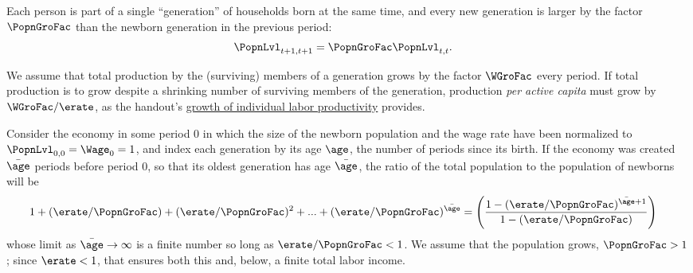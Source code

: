 \documentclass{econark}
\begin{document}
Each person is part of a single ``generation'' of households born at the
same time, and every new generation is larger by the factor $\PopnGroFac$
than the newborn generation in the previous period:
\begin{equation}\begin{gathered}\begin{aligned}
  \PopnLvl_{t+1,t+1} & =  \PopnGroFac \PopnLvl_{t,t}
.
\end{aligned}\end{gathered}\end{equation}

We assume that total production by the (surviving) members of a generation grows by
the factor $\WGroFac$ every period.  If total production is to grow
despite a shrinking number of surviving members of the generation, 
production {\it per active capita} must grow by $\WGroFac/\erate$, as the handout's \hyperref[eq:meanPreserve]{growth of individual labor productivity} provides.

Consider the economy in some period 0 in which the size of the newborn population
and the wage rate have been normalized to $\PopnLvl_{0,0} = \Wage_{0} = 1$, and index each generation by its age $\age$, the number of periods since its birth. If the economy was created $\bar{\age}$ periods before period 0, so that its oldest generation has age $\bar{\age}$, the ratio of the total population to the population
of newborns will be 
\begin{equation}\begin{gathered}\begin{aligned}
  1 + (\erate/\PopnGroFac)+ (\erate/\PopnGroFac)^{2}+ ... +(\erate/\PopnGroFac)^{\bar{\age}} & =  \left(\frac{1-(\erate/\PopnGroFac)^{\bar{\age}+1}}{1-(\erate/\PopnGroFac)}\right)
\end{aligned}\end{gathered}\end{equation}
whose limit as $\bar{\age} \rightarrow \infty$ is a finite number so long as $\erate/\PopnGroFac < 1$.  We assume that the population grows, $\PopnGroFac > 1$; since $\erate < 1$, that ensures both this and, below, a finite total labor income.
\end{document}
